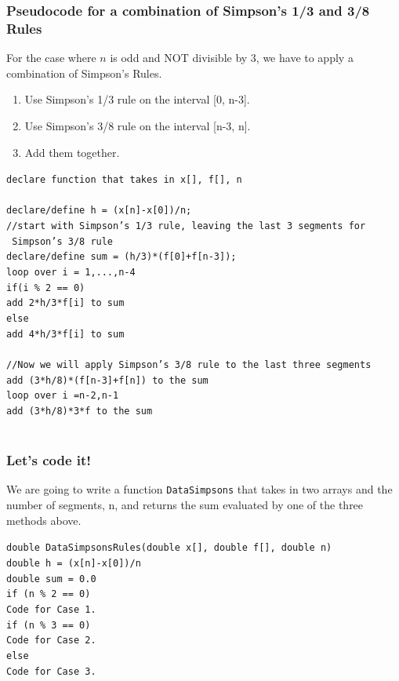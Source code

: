\documentclass{if-beamer}
\begin{document}
\begin{frame}
	\frametitle{Pseudocode for a combination of Simpson's 1/3 and 3/8 Rules}
	For the case where $n$ is odd and NOT divisible by 3, we have to apply a combination of Simpson's Rules.
	\begin{enumerate}
		\item Use Simpson's 1/3 rule on the interval [0, n-3].
		\item Use Simpson's 3/8 rule on the interval [n-3, n].
		\item Add them together.
	\end{enumerate}
	\vspace{5pt}
	\texttt{declare function that takes in x[], f[], n}\\
	\texttt{ }\\
	\texttt{declare/define h = (x[n]-x[0])/n;}\\
	\texttt{//start with Simpson's 1/3 rule, leaving the last 3 segments for }\\
	\texttt{  Simpson's 3/8 rule}\\
	\texttt{declare/define sum = (h/3)*(f[0]+f[n-3]);}\\
	\texttt{loop over i = 1,...,n-4 }\\
	\texttt{\qquad if(i \% 2 == 0)}\\
	\texttt{\qquad \qquad add 2*h/3*f[i] to sum} \\
	\texttt{\qquad else}\\
	\texttt{\qquad \qquad add 4*h/3*f[i] to sum}\\
	\texttt{ }\\
	\texttt{//Now we will apply Simpson's 3/8 rule to the last three segments}\\
	\texttt{add (3*h/8)*(f[n-3]+f[n]) to the sum}\\
	\texttt{loop over i =n-2,n-1}\\
	\texttt{\qquad add (3*h/8)*3*f to the sum}\\
	\texttt{ } 
\end{frame}

\begin{frame}
	\frametitle{Let's code it!}
	We are going to write a function \texttt{DataSimpsons} that takes in two arrays and the number of segments, n, and returns the sum evaluated by one of the three methods above.\vspace{10pt}
	
	\texttt{double DataSimpsonsRules(double x[], double f[], double n)}\\
	\texttt{double h = (x[n]-x[0])/n}\\
	\texttt{double sum = 0.0} \\
	\texttt{if (n \% 2 == 0)}\\
	\texttt{\qquad Code for Case 1.}\\
	\texttt{if (n \% 3 == 0)}\\
	\texttt{\qquad Code for Case 2.}\\
	\texttt{else}\\
	\texttt{\qquad Code for Case 3.}	

\end{frame}
\end{document}
